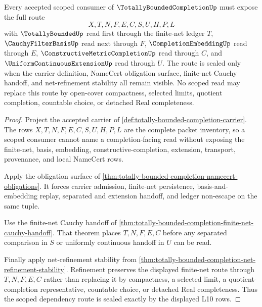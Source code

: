 \begin{theorem}
\label{thm:totally-bounded-completion-scope-dependency-seal}
Every accepted scoped consumer of $\TotallyBoundedCompletionUp$ must expose the full route
$$
X,T,N,F,E,C,S,U,H,P,L
$$
with $\TotallyBoundedUp$ read first through the finite-net ledger $T$, $\CauchyFilterBasisUp$ read next through $F$, $\CompletionEmbeddingUp$ read through $E$, $\ConstructiveMetricCompletionUp$ read through $C$, and $\UniformContinuousExtensionUp$ read through $U$. The route is sealed only when the carrier definition, NameCert obligation surface, finite-net Cauchy handoff, and net-refinement stability all remain visible. No scoped read may replace this route by open-cover compactness, selected limits, quotient completion, countable choice, or detached Real completeness.
\end{theorem}
\begin{proof}
Project the accepted carrier of \autoref{def:totally-bounded-completion-carrier}. The rows $X,T,N,F,E,C,S,U,H,P,L$ are the complete packet inventory, so a scoped consumer cannot name a completion-facing read without exposing the finite-net, basis, embedding, constructive-completion, extension, transport, provenance, and local NameCert rows.

Apply the obligation surface of \autoref{thm:totally-bounded-completion-namecert-obligations}. It forces carrier admission, finite-net persistence, basis-and-embedding replay, separated and extension handoff, and ledger non-escape on the same tuple.

Use the finite-net Cauchy handoff of \autoref{thm:totally-bounded-completion-finite-net-cauchy-handoff}. That theorem places $T,N,F,E,C$ before any separated comparison in $S$ or uniformly continuous handoff in $U$ can be read.

Finally apply net-refinement stability from \autoref{thm:totally-bounded-completion-net-refinement-stability}. Refinement preserves the displayed finite-net route through $T,N,F,E,C$ rather than replacing it by compactness, a selected limit, a quotient-completion representative, countable choice, or detached Real completeness. Thus the scoped dependency route is sealed exactly by the displayed L10 rows.
\end{proof}

